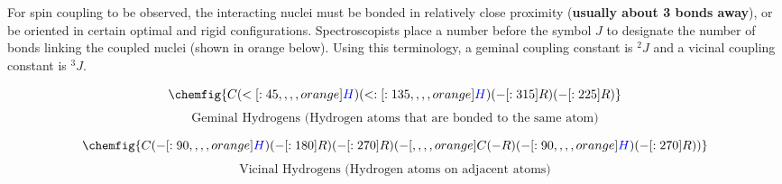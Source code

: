 \documentclass[11pt]{article}
\begin{document}
For spin coupling to be observed, the interacting nuclei must be bonded in relatively close proximity (\textbf{usually about 3 bonds away}), or be oriented in certain optimal and rigid configurations. Spectroscopists place a number before the symbol \(J\) to designate the number of bonds linking the coupled nuclei (shown in orange below). Using this terminology, a geminal coupling constant is \(^2J\) and a vicinal coupling constant is \(^3J\).

\[\chemfig{C(<[:45,,,,orange]{\color{blue}H})(<:[:135,,,,orange]{\color{blue}H})(-[:315]R)(-[:225]R)}\]
\[\text{Geminal Hydrogens (Hydrogen atoms that are bonded to the same atom)}\]

\[
\chemfig{C(-[:90,,,,orange]{\color{blue}H})(-[:180]R)(-[:270]R)
(-[,,,,orange]C(-R)(-[:90,,,,orange]{\color{blue}H})(-[:270]R))}
\]
\[\text{Vicinal Hydrogens (Hydrogen atoms on adjacent atoms)}\]
\end{document}
